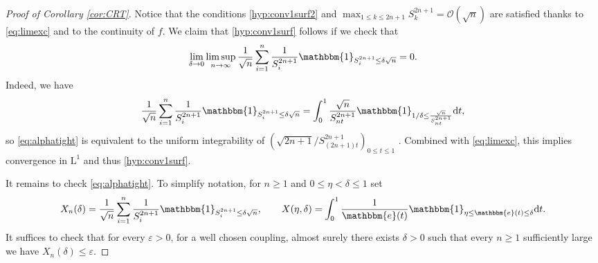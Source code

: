 \documentclass[11pt]{article}
\theoremstyle{plain}
\theoremstyle{definition}
\theoremstyle{remark}
\newcommand{\1}{\mathbbm{1}} %
\newcommand{\e}{\varepsilon} %
\begin{document}
\begin{proof}[Proof of Corollary \ref{cor:CRT}]
{
Notice that the conditions \ref{hyp:conv1surf2} and $\max_{1 \leq  k \leq 2n+1} S^{2n+1}_{k}= \mathcal{O}(\sqrt{n})$ are satisfied thanks to \eqref{eq:limexc} and to the continuity of $f$. We claim that \ref{hyp:conv1surf} follows if we check that
\begin{equation}
\label{eq:alphatight}\lim_{\delta\to 0} \limsup_{n\to \infty} \frac{1}{\sqrt{n}} \sum_{i=1}^n  \frac{1}{S^{2n+1}_{i}} \mathbbm{1}_{S^{2n+1}_{i}\leq \delta \sqrt{n}}=0.
\end{equation}
Indeed, we have
\[
\frac{1}{\sqrt{n}} \sum_{i=1}^n  \frac{1}{S^{2n+1}_{i}} \mathbbm{1}_{S^{2n+1}_{i}\leq \delta \sqrt{n}}=\int_{0}^{1}  \frac{\sqrt{n}}{S^{2n+1}_{nt}} \mathbbm{1}_{1/\delta \leq   \frac{\sqrt{n}}{S^{2n+1}_{nt}}} \mathrm{d}t,
\]
so \eqref{eq:alphatight} is equivalent to the uniform integrability of $ (\sqrt{2n+1}/S^{2n+1}_{ (2n+1)t })_{0 \leq t \leq 1}$ . Combined with \eqref{eq:limexc}, this implies convergence in $\mathrm{L}^{1}$ and thus   \ref{hyp:conv1surf}.}



It remains to check \eqref{eq:alphatight}.   To simplify notation, for $n \geq 1$ and $0 \leq \eta < \delta \leq 1$ set
\[
X_{n}(\delta)= \frac{1}{\sqrt{n}} \sum_{i=1}^n  \frac{1}{S^{2n+1}_{i}} \mathbbm{1}_{S^{2n+1}_{i}\leq \delta \sqrt{n}}, \qquad X(\eta,\delta)= \int_{0}^{1} \frac{1}{\mathbbm{e}(t)} \mathbbm{1}_{\eta \leq \mathbbm{e}(t) \leq \delta}\mathrm{d} t.
\]
It suffices to check that for every $\e>0$, for a well chosen coupling, almost surely  there exists $\delta>0$ such that  every $n \geq 1$ sufficiently large we have
$X_{n}(\delta) \leq \e$.


\end{proof}
\end{document}
